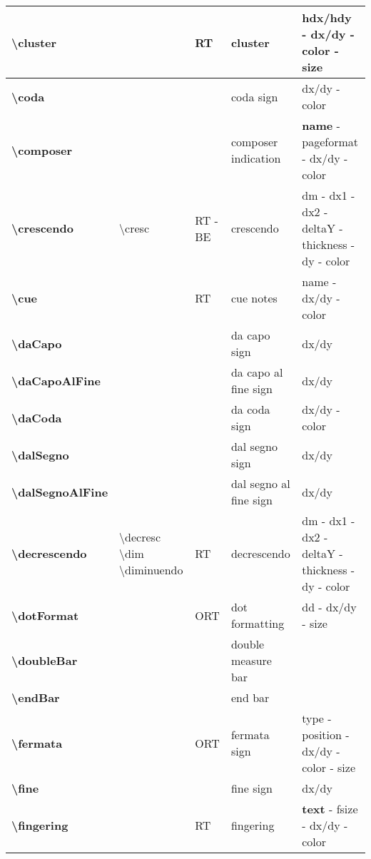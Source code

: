 \documentclass[a4paper, landscape, 10pt]{article}
\begin{document}
\begin{tabularx}{\linewidth}{p{3cm}p{4.5cm}p{3cm}p{5.5cm}l}
    \hline
    \textbf{\textbackslash{}cluster}&&RT&cluster&hdx/hdy - dx/dy - color - size\\
    \hline
    \textbf{\textbackslash{}coda}&&&coda sign&dx/dy - color\\
    \hline
    \textbf{\textbackslash{}composer}&&&composer indication&\textbf{name} - pageformat - dx/dy - color\\
    \hline
    \textbf{\textbackslash{}crescendo}&\textbackslash{}cresc&RT - BE&crescendo&dm - dx1 - dx2 - deltaY - thickness - dy - color\\
    \hline
    \textbf{\textbackslash{}cue}&&RT&cue notes&name - dx/dy - color\\
    \hline
    \textbf{\textbackslash{}daCapo}&&&da capo sign&dx/dy\\
    \hline
    \textbf{\textbackslash{}daCapoAlFine}&&&da capo al fine sign&dx/dy\\
    \hline
    \textbf{\textbackslash{}daCoda}&&&da coda sign&dx/dy - color\\
    \hline
    \textbf{\textbackslash{}dalSegno}&&&dal segno sign&dx/dy\\
    \hline
    \textbf{\textbackslash{}dalSegnoAlFine}&&&dal segno al fine sign&dx/dy\\
    \hline
    \textbf{\textbackslash{}decrescendo}&\textbackslash{}decresc \textbackslash{}dim \textbackslash{}diminuendo&RT&decrescendo&dm - dx1 - dx2 - deltaY - thickness - dy - color\\
    \hline
    \textbf{\textbackslash{}dotFormat}&&ORT&dot formatting&dd - dx/dy - size\\
    \hline
    \textbf{\textbackslash{}doubleBar}&&&double measure bar&\\
    \hline
    \textbf{\textbackslash{}endBar}&&&end bar&\\
    \hline
    \textbf{\textbackslash{}fermata}&&ORT&fermata sign&type - position - dx/dy - color - size\\
    \hline
    \textbf{\textbackslash{}fine}&&&fine sign&dx/dy\\
    \hline
    \textbf{\textbackslash{}fingering}&&RT&fingering&\textbf{text} - fsize - dx/dy - color\\

\end{tabularx}
\end{document}
